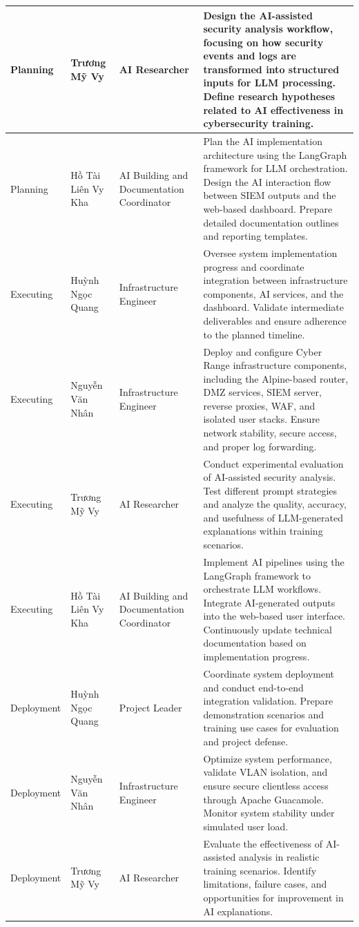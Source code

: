 \begin{longtable}{|p{2.5cm}|p{3.0cm}|p{2.8cm}|p{5.2cm}|}
	\hline
	Planning & Trương Mỹ Vy & AI Researcher & Design the AI-assisted security analysis workflow, focusing on how security events and logs are transformed into structured inputs for LLM processing. Define research hypotheses related to AI effectiveness in cybersecurity training. \\
	\hline
	Planning & Hồ Tài Liên Vy Kha & AI Building and Documentation Coordinator & Plan the AI implementation architecture using the LangGraph framework for LLM orchestration. Design the AI interaction flow between SIEM outputs and the web-based dashboard. Prepare detailed documentation outlines and reporting templates. \\
	\hline
	Executing & Huỳnh Ngọc Quang & Infrastructure Engineer & Oversee system implementation progress and coordinate integration between infrastructure components, AI services, and the dashboard. Validate intermediate deliverables and ensure adherence to the planned timeline. \\
	\hline
	Executing & Nguyễn Văn Nhân & Infrastructure Engineer & Deploy and configure Cyber Range infrastructure components, including the Alpine-based router, DMZ services, SIEM server, reverse proxies, WAF, and isolated user stacks. Ensure network stability, secure access, and proper log forwarding. \\
	\hline
	Executing & Trương Mỹ Vy & AI Researcher & Conduct experimental evaluation of AI-assisted security analysis. Test different prompt strategies and analyze the quality, accuracy, and usefulness of LLM-generated explanations within training scenarios. \\
	\hline
	Executing & Hồ Tài Liên Vy Kha & AI Building and Documentation Coordinator & Implement AI pipelines using the LangGraph framework to orchestrate LLM workflows. Integrate AI-generated outputs into the web-based user interface. Continuously update technical documentation based on implementation progress. \\
	\hline
	Deployment & Huỳnh Ngọc Quang & Project Leader & Coordinate system deployment and conduct end-to-end integration validation. Prepare demonstration scenarios and training use cases for evaluation and project defense. \\
	\hline
	Deployment & Nguyễn Văn Nhân & Infrastructure Engineer & Optimize system performance, validate VLAN isolation, and ensure secure clientless access through Apache Guacamole. Monitor system stability under simulated user load. \\
	\hline
	Deployment & Trương Mỹ Vy & AI Researcher & Evaluate the effectiveness of AI-assisted analysis in realistic training scenarios. Identify limitations, failure cases, and opportunities for improvement in AI explanations. \\

\end{longtable}
